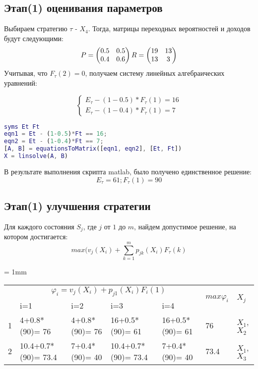 \subsection{Этап(1) оценивания параметров}
Выбираем стратегию $\tau$ - $X_4$.  Тогда, матрицы переходных вероятностей и доходов будут следующими:
\begin{equation*}
P=\begin{pmatrix}
0.5 & 0.5\\
0.4 & 0.6
\end{pmatrix}\\
R=\begin{pmatrix}
19 & 13\\
13 & 3
\end{pmatrix}
\end{equation*}
Учитывая, что  $F_{\tau}(2)=0$, получаем систему линейных алгебраических уравнений:

\begin{equation*}
\begin{cases}
E_{\tau}-(1-0.5)*F_{\tau}(1)=16\\
E_{\tau}-(1-0.4)*F_{\tau}(1)=7
\end{cases}
\end{equation*}
\begin{lstlisting}[language={matlab}, caption={Скрпит для решения системы уравнений},basicstyle=\ttfamily]
syms Et Ft
eqn1 = Et - (1-0.5)*Ft == 16;
eqn2 = Et - (1-0.4)*Ft == 7;
[A, B] = equationsToMatrix([eqn1, eqn2], [Et, Ft])
X = linsolve(A, B)
\end{lstlisting}
В результате выполнения скрипта matlab, было получено единственное решение:
\begin{equation*}
E_{\tau}=61; F_{\tau}(1)=90
\end{equation*}

\subsection{Этап(1) улучшения стратегии}
Для каждого состояния $S_j$, где $j$ от $1$ до $m$, найдем допустимое решение, на котором достигается:
\begin{equation*}
max(v_j(X_i)+\sum_{k=1}^mp_{jk}(X_i)F_{\tau}(k)
\end{equation*}


\tabulinesep = 1mm
\begin{longtabu} to \textwidth {|X[1, c , m ] |X[3, c , m ] | X[3,c , m ]|X[3,c , m ]|X[3,c , m ]| X[2,c , m ]|X[1,c , m ]|}\firsthline\hline

 &  &  & \\ 
&i=1&i=2&i=3&i=4&&\\ &4+0.8*(90)= 76&4+0.8*(90)= 76&16+0.5*(90)= 61&16+0.5*(90)= 61&76&$X_1$, $X_2$\\ &10.4+0.7*(90)= 73.4&7+0.4*(90)= 40&10.4+0.7*(90)= 73.4&7+0.4*(90)= 40&73.4&$X_1$, $X_3$\\ \hline
\end{longtabu}



